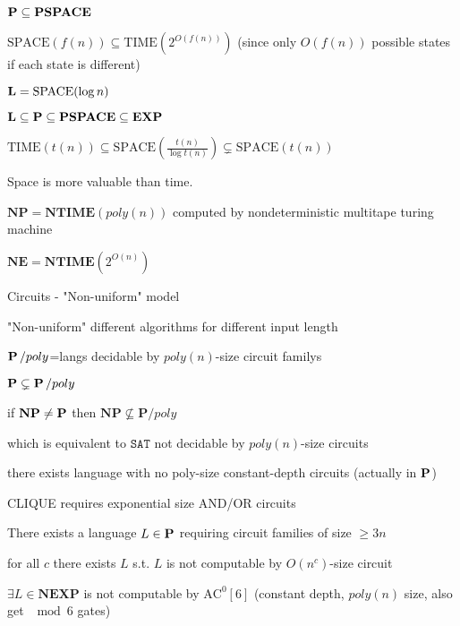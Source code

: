 \documentclass[11pt]{article}
\def \TIME {\text{TIME}}
\def \EXP {\textbf{EXP}}
\def \SPACE {\text{SPACE}}
\def \PSPACE {\textbf{PSPACE}}
\def \NTIME {\textbf{NTIME}}
\def \NP {\textbf{NP}}
\def \NEXP {\textbf{NEXP}}
\def \NE {\textbf{NE}}
\def \Pspoly {\textbf{P}/poly}
\def \SAT {\text{SAT}}
\def \AC {\text{AC}}
\def \NP {\textbf{NP}}
\def \SAT {\texttt{SAT}}
\begin{document}
\(\bP\subseteq\PSPACE\)

\(\SPACE(f(n))\subseteq\TIME(2^{O(f(n))})\) (since only \(O(f(n))\) possible states if each state
is different)

\(\bL=\SPACE(\log n)\)

\(\bL\subseteq\bP\subseteq\PSPACE\subseteq\EXP\)

\begin{theorem}[HPV77]
\(\TIME(t(n))\subseteq\SPACE(\frac{t(n)}{\log t(n)})\subsetneq\SPACE(t(n))\)
\end{theorem}

Space is more valuable than time.

\(\NP=\NTIME(poly(n))\) computed by nondeterministic multitape turing machine

\(\NE=\NTIME(2^{O(n)})\)

Circuits - "Non-uniform" model

"Non-uniform" different algorithms for different input length

\(\operatorname{\textbf{P}}/poly\)=langs decidable by \(poly(n)\)-size circuit familys

\(\operatorname{\textbf{P}}\subsetneq\operatorname{\textbf{P}}/poly\)

if \(\NP\neq\bP\) then \(\NP\not\subseteq\Pspoly\)

which is equivalent to \(\SAT\) not decidable by \(poly(n)\)-size circuits

\begin{theorem}[]
there exists language with no poly-size constant-depth circuits (actually in \(\operatorname{\textbf{P}}\))
\end{theorem}

\begin{theorem}[]
CLIQUE requires exponential size AND/OR circuits
\end{theorem}

\begin{theorem}[]
There exists a language \(L\in\operatorname{\textbf{P}}\) requiring circuit families of size \(\ge3 n\)
\end{theorem}


\begin{theorem}
for all \(c\) there exists \(L\) s.t. \(L\) is not computable by \(O(n^c)\)-size circuit
\end{theorem}

\begin{theorem}
\(\exists L\in\NEXP\) is not computable by \(\AC^0[6]\) (constant depth, \(poly(n)\) size, also
get \(\mod6\) gates)
\end{theorem}
\end{document}
